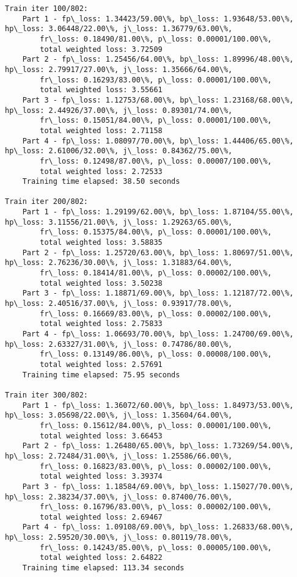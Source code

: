 \documentclass[11pt]{article}
\begin{document}
\begin{Verbatim}[commandchars=\\\{\}]
Train iter 100/802:
	Part 1 - fp\_loss: 1.34423/59.00\%, bp\_loss: 1.93648/53.00\%, hp\_loss: 3.06448/22.00\%, j\_loss: 1.36779/63.00\%, 
		fr\_loss: 0.18490/81.00\%, p\_loss: 0.00001/100.00\%, 
		total weighted loss: 3.72509
	Part 2 - fp\_loss: 1.25456/64.00\%, bp\_loss: 1.89996/48.00\%, hp\_loss: 2.79917/27.00\%, j\_loss: 1.35666/64.00\%, 
		fr\_loss: 0.16293/83.00\%, p\_loss: 0.00001/100.00\%, 
		total weighted loss: 3.55661
	Part 3 - fp\_loss: 1.12753/68.00\%, bp\_loss: 1.23168/68.00\%, hp\_loss: 2.44926/37.00\%, j\_loss: 0.89301/74.00\%, 
		fr\_loss: 0.15051/84.00\%, p\_loss: 0.00001/100.00\%, 
		total weighted loss: 2.71158
	Part 4 - fp\_loss: 1.08097/70.00\%, bp\_loss: 1.44406/65.00\%, hp\_loss: 2.61006/32.00\%, j\_loss: 0.84362/75.00\%, 
		fr\_loss: 0.12498/87.00\%, p\_loss: 0.00007/100.00\%, 
		total weighted loss: 2.72533
	Training time elapsed: 38.50 seconds

Train iter 200/802:
	Part 1 - fp\_loss: 1.29199/62.00\%, bp\_loss: 1.87104/55.00\%, hp\_loss: 3.11556/21.00\%, j\_loss: 1.29263/65.00\%, 
		fr\_loss: 0.15375/84.00\%, p\_loss: 0.00001/100.00\%, 
		total weighted loss: 3.58835
	Part 2 - fp\_loss: 1.25720/63.00\%, bp\_loss: 1.80697/51.00\%, hp\_loss: 2.76236/30.00\%, j\_loss: 1.31883/64.00\%, 
		fr\_loss: 0.18414/81.00\%, p\_loss: 0.00002/100.00\%, 
		total weighted loss: 3.50238
	Part 3 - fp\_loss: 1.18871/69.00\%, bp\_loss: 1.12187/72.00\%, hp\_loss: 2.40516/37.00\%, j\_loss: 0.93917/78.00\%, 
		fr\_loss: 0.16669/83.00\%, p\_loss: 0.00002/100.00\%, 
		total weighted loss: 2.75833
	Part 4 - fp\_loss: 1.06693/70.00\%, bp\_loss: 1.24700/69.00\%, hp\_loss: 2.63327/31.00\%, j\_loss: 0.74786/80.00\%, 
		fr\_loss: 0.13149/86.00\%, p\_loss: 0.00008/100.00\%, 
		total weighted loss: 2.57691
	Training time elapsed: 75.95 seconds

Train iter 300/802:
	Part 1 - fp\_loss: 1.36072/60.00\%, bp\_loss: 1.84973/53.00\%, hp\_loss: 3.05698/22.00\%, j\_loss: 1.35604/64.00\%, 
		fr\_loss: 0.15612/84.00\%, p\_loss: 0.00001/100.00\%, 
		total weighted loss: 3.66453
	Part 2 - fp\_loss: 1.26480/65.00\%, bp\_loss: 1.73269/54.00\%, hp\_loss: 2.72484/31.00\%, j\_loss: 1.25586/66.00\%, 
		fr\_loss: 0.16823/83.00\%, p\_loss: 0.00002/100.00\%, 
		total weighted loss: 3.39374
	Part 3 - fp\_loss: 1.18584/69.00\%, bp\_loss: 1.15027/70.00\%, hp\_loss: 2.38234/37.00\%, j\_loss: 0.87400/76.00\%, 
		fr\_loss: 0.16796/83.00\%, p\_loss: 0.00002/100.00\%, 
		total weighted loss: 2.69467
	Part 4 - fp\_loss: 1.09108/69.00\%, bp\_loss: 1.26833/68.00\%, hp\_loss: 2.59520/30.00\%, j\_loss: 0.80119/78.00\%, 
		fr\_loss: 0.14243/85.00\%, p\_loss: 0.00005/100.00\%, 
		total weighted loss: 2.64822
	Training time elapsed: 113.34 seconds


\end{Verbatim}
\end{document}
